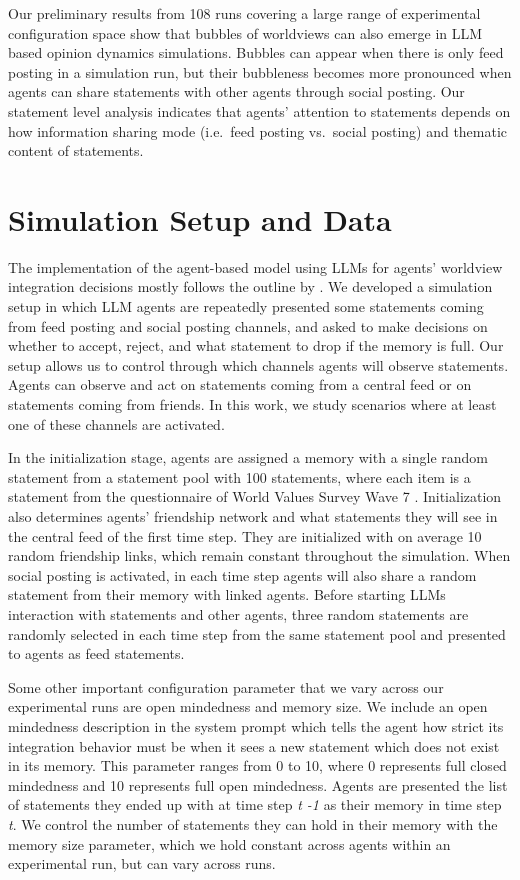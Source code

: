 \documentclass[]{ceurart}
\begin{document}
Our preliminary results from 108 runs covering a large range of
experimental configuration space show that bubbles of worldviews can
also emerge in LLM based opinion dynamics simulations. Bubbles can
appear when there is only feed posting in a simulation run, but their
bubbleness becomes more pronounced when agents can share statements with
other agents through social posting. Our statement level analysis
indicates that agents' attention to statements depends on how
information sharing mode (i.e.~feed posting vs.~social posting) and
thematic content of statements.

\section{Simulation Setup and Data}\label{simulation-setup-and-data}

The implementation of the agent-based model using LLMs for agents'
worldview integration decisions mostly follows the outline by
\citet{LorenzGunes2025FilterBubblesAgentbased}. We developed a
simulation setup in which LLM agents are repeatedly presented some
statements coming from feed posting and social posting channels, and
asked to make decisions on whether to accept, reject, and what statement
to drop if the memory is full. Our setup allows us to control through
which channels agents will observe statements. Agents can observe and
act on statements coming from a central feed or on statements coming
from friends. In this work, we study scenarios where at least one of
these channels are activated.

In the initialization stage, agents are assigned a memory with a single
random statement from a statement pool with 100 statements, where each
item is a statement from the questionnaire of World Values Survey Wave 7
\citep{HaerpferEtAl2022WorldValuesSurvey}. Initialization also
determines agents' friendship network and what statements they will see
in the central feed of the first time step. They are initialized with on
average 10 random friendship links, which remain constant throughout the
simulation. When social posting is activated, in each time step agents
will also share a random statement from their memory with linked agents.
Before starting LLMs interaction with statements and other agents, three
random statements are randomly selected in each time step from the same
statement pool and presented to agents as feed statements.

Some other important configuration parameter that we vary across our
experimental runs are open mindedness and memory size. We include an
open mindedness description in the system prompt which tells the agent
how strict its integration behavior must be when it sees a new statement
which does not exist in its memory. This parameter ranges from 0 to 10,
where 0 represents full closed mindedness and 10 represents full open
mindedness. Agents are presented the list of statements they ended up
with at time step \emph{t -1} as their memory in time step \emph{t}. We
control the number of statements they can hold in their memory with the
memory size parameter, which we hold constant across agents within an
experimental run, but can vary across runs.
\end{document}
